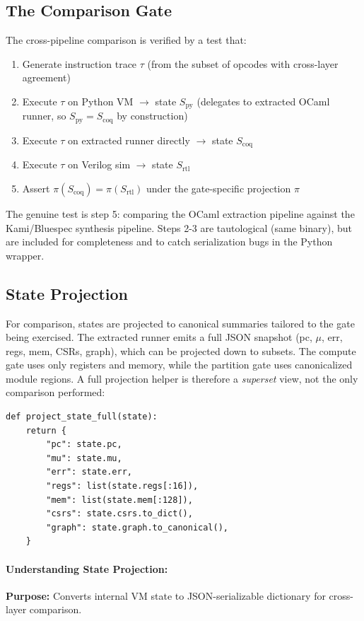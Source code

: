 \subsection{The Comparison Gate}

The cross-pipeline comparison is verified by a test that:
\begin{enumerate}
    \item Generate instruction trace $\tau$ (from the subset of opcodes with cross-layer agreement)
    \item Execute $\tau$ on Python VM $\rightarrow$ state $S_{\text{py}}$ (delegates to extracted OCaml runner, so $S_{\text{py}} = S_{\text{coq}}$ by construction)
    \item Execute $\tau$ on extracted runner directly $\rightarrow$ state $S_{\text{coq}}$
    \item Execute $\tau$ on Verilog sim $\rightarrow$ state $S_{\text{rtl}}$
    \item Assert $\pi(S_{\text{coq}}) = \pi(S_{\text{rtl}})$ under the gate-specific projection $\pi$
\end{enumerate}
The genuine test is step 5: comparing the OCaml extraction pipeline against the Kami/Bluespec synthesis pipeline. Steps 2-3 are tautological (same binary), but are included for completeness and to catch serialization bugs in the Python wrapper.

\subsection{State Projection}

For comparison, states are projected to canonical summaries tailored to the gate being exercised. The extracted runner emits a full JSON snapshot (pc, $\mu$, err, regs, mem, CSRs, graph), which can be projected down to subsets. The compute gate uses only registers and memory, while the partition gate uses canonicalized module regions. A full projection helper is therefore a \emph{superset} view, not the only comparison performed:
\begin{lstlisting}
def project_state_full(state):
    return {
        "pc": state.pc,
        "mu": state.mu,
        "err": state.err,
        "regs": list(state.regs[:16]),
        "mem": list(state.mem[:128]),
        "csrs": state.csrs.to_dict(),
        "graph": state.graph.to_canonical(),
    }
\end{lstlisting}

\paragraph{Understanding State Projection:}
\textbf{Purpose:} Converts internal VM state to JSON-serializable dictionary for cross-layer comparison.


